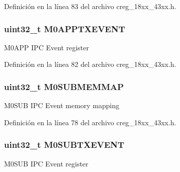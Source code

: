 Definición en la línea 83 del archivo creg\+\_\+18xx\+\_\+43xx.\+h.

\subsubsection[{\texorpdfstring{M0\+A\+P\+P\+T\+X\+E\+V\+E\+NT}{M0APPTXEVENT}}]{ uint32\+\_\+t M0\+A\+P\+P\+T\+X\+E\+V\+E\+NT}\hypertarget{struct_l_p_c___c_r_e_g___t_a1056c3cad4eb4094e18c4bdac511eb81}{}\label{struct_l_p_c___c_r_e_g___t_a1056c3cad4eb4094e18c4bdac511eb81}
M0\+A\+PP I\+PC Event register 

Definición en la línea 82 del archivo creg\+\_\+18xx\+\_\+43xx.\+h.

\subsubsection[{\texorpdfstring{M0\+S\+U\+B\+M\+E\+M\+M\+AP}{M0SUBMEMMAP}}]{ uint32\+\_\+t M0\+S\+U\+B\+M\+E\+M\+M\+AP}\hypertarget{struct_l_p_c___c_r_e_g___t_ae818dd381d5c4790d3bb4c9ad08fd1c4}{}\label{struct_l_p_c___c_r_e_g___t_ae818dd381d5c4790d3bb4c9ad08fd1c4}
M0\+S\+UB I\+PC Event memory mapping 

Definición en la línea 78 del archivo creg\+\_\+18xx\+\_\+43xx.\+h.

\subsubsection[{\texorpdfstring{M0\+S\+U\+B\+T\+X\+E\+V\+E\+NT}{M0SUBTXEVENT}}]{ uint32\+\_\+t M0\+S\+U\+B\+T\+X\+E\+V\+E\+NT}\hypertarget{struct_l_p_c___c_r_e_g___t_ad2bc316b8bf31d2a422a4900a8cad52e}{}\label{struct_l_p_c___c_r_e_g___t_ad2bc316b8bf31d2a422a4900a8cad52e}
M0\+S\+UB I\+PC Event register 

